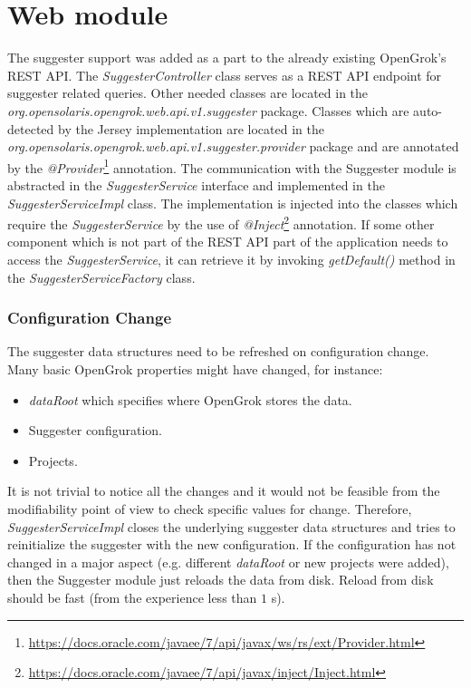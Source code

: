 \section{Web module}
The suggester support was added as a part to the already existing OpenGrok's REST API. The \textit{SuggesterController}
class serves as a REST API endpoint for suggester related queries. Other needed classes are located in the
\textit{org.opensolaris.opengrok.web.api.v1.suggester} package. Classes which are auto-detected by the Jersey
implementation are located in the \textit{org.opensolaris.opengrok.web.api.v1.suggester.provider} package and are annotated
by the \textit{@Provider}\footnote{\url{https://docs.oracle.com/javaee/7/api/javax/ws/rs/ext/Provider.html}} annotation.
The communication with the Suggester module is abstracted in the \textit{SuggesterService} interface and implemented in the
\textit{SuggesterServiceImpl} class. The implementation is injected into the classes which require the
\textit{SuggesterService} by the use of
\textit{@Inject}\footnote{\url{https://docs.oracle.com/javaee/7/api/javax/inject/Inject.html}} annotation. If some other
component which is not part of the REST API part of the application needs to access the \textit{SuggesterService},
it can retrieve it by invoking \textit{getDefault()} method in the \textit{SuggesterServiceFactory} class.

\subsubsection{Configuration Change}
The suggester data structures need to be refreshed on configuration change.
Many basic OpenGrok properties might have changed, for instance:
\begin{itemize}
    \item \textit{dataRoot} which specifies where OpenGrok stores the data.
    \item Suggester configuration.
    \item Projects.
\end{itemize}

It is not trivial to notice all the changes and it would not be feasible from the modifiability point of view to check
specific values for change. Therefore, \textit{SuggesterServiceImpl} closes the underlying suggester data structures
and tries to reinitialize the suggester with the new configuration. If the configuration has not changed in a major
aspect (e.g. different \textit{dataRoot} or new projects were added), then the Suggester module just reloads the data
from disk. Reload from disk should be fast (from the experience less than $1$ s).

